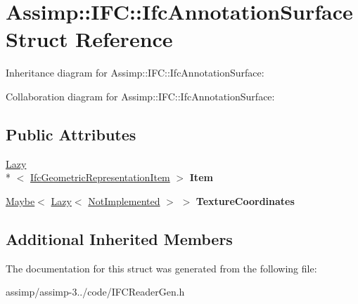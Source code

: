 \hypertarget{struct_assimp_1_1_i_f_c_1_1_ifc_annotation_surface}{\section{Assimp\+:\+:I\+F\+C\+:\+:Ifc\+Annotation\+Surface Struct Reference}
\label{struct_assimp_1_1_i_f_c_1_1_ifc_annotation_surface}
}


Inheritance diagram for Assimp\+:\+:I\+F\+C\+:\+:Ifc\+Annotation\+Surface\+:


Collaboration diagram for Assimp\+:\+:I\+F\+C\+:\+:Ifc\+Annotation\+Surface\+:
\subsection*{Public Attributes}
\begin{DoxyCompactItemize}
\item 
\hypertarget{struct_assimp_1_1_i_f_c_1_1_ifc_annotation_surface_a47fac59bf721fc47df8cce8980e3fcab}{\hyperlink{struct_assimp_1_1_s_t_e_p_1_1_lazy}{Lazy}\\*
$<$ \hyperlink{struct_assimp_1_1_i_f_c_1_1_ifc_geometric_representation_item}{Ifc\+Geometric\+Representation\+Item} $>$ {\bfseries Item}}\label{struct_assimp_1_1_i_f_c_1_1_ifc_annotation_surface_a47fac59bf721fc47df8cce8980e3fcab}

\item 
\hypertarget{struct_assimp_1_1_i_f_c_1_1_ifc_annotation_surface_a2ebb5ef40fad540097cc8dfc5c931ff0}{\hyperlink{struct_assimp_1_1_s_t_e_p_1_1_maybe}{Maybe}$<$ \hyperlink{struct_assimp_1_1_s_t_e_p_1_1_lazy}{Lazy}$<$ \hyperlink{struct_assimp_1_1_i_f_c_1_1_not_implemented}{Not\+Implemented} $>$ $>$ {\bfseries Texture\+Coordinates}}\label{struct_assimp_1_1_i_f_c_1_1_ifc_annotation_surface_a2ebb5ef40fad540097cc8dfc5c931ff0}

\end{DoxyCompactItemize}
\subsection*{Additional Inherited Members}


The documentation for this struct was generated from the following file\+:\begin{DoxyCompactItemize}
\item 
assimp/assimp-\/3../code/I\+F\+C\+Reader\+Gen.\+h\end{DoxyCompactItemize}
